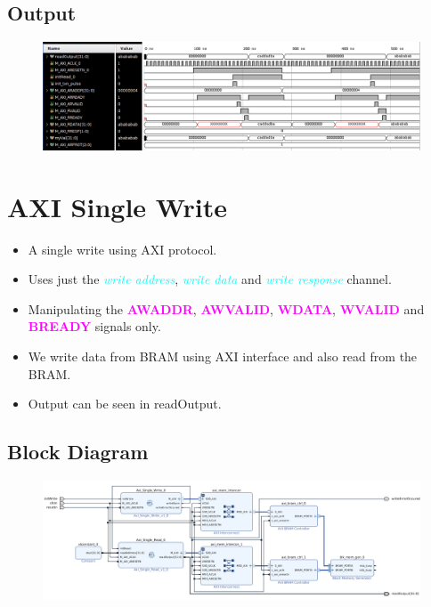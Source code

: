 \documentclass{article}
\newcommand{\chFormat}[1]{\emph{\textcolor{cyan}{#1}}}
\newcommand{\AXISignals}[1]{\textbf{\textcolor{magenta}{#1}}}
\begin{document}
\subsection{Output}
\begin{figure}[H]
    \centering
    \includegraphics[width=1\textwidth]{Resources/SingleReadBRAMoutput.png}
\end{figure}


\section{AXI Single Write}
\begin{itemize}
    \item A single write using AXI protocol.
    \item Uses just the \chFormat{write address}, \chFormat{write data} and \chFormat{write response} channel.
    \item Manipulating the \AXISignals{AWADDR}, \AXISignals{AWVALID}, \AXISignals{WDATA}, \AXISignals{WVALID} and \AXISignals{BREADY} signals only.
    \item We write data from BRAM using AXI interface and also read from the BRAM.
    \item Output can be seen in readOutput.
\end{itemize}
\subsection{Block Diagram}
\begin{figure}[H]
    \centering
    \includegraphics[width=1\textwidth]{Resources/SingleWriteBRAM.png}
\end{figure}
\end{document}
